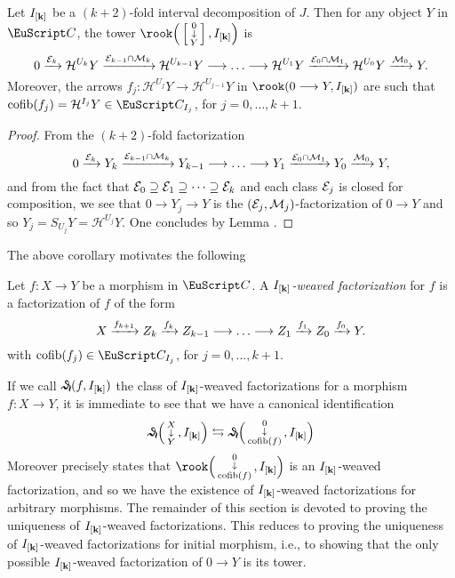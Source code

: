 \begin{corollary}\label{cor:perPostnikov}
Let $I_{[\mathbf{k}]}$ be a $(k+2)$-fold interval decomposition of $J$. Then for any object $Y$ in $\C$, the tower $\rook\Big(\var{0}{Y},I_{\ordk}\Big)$
is
\[
0 \xto{\E_{k}} \mathcal{H}^{U_k}Y \xto{\E_{k-1}\cap \M_{k}} \mathcal{H}^{U_{k-1}}Y\to\dots\to \mathcal{H}^{U_1}Y \xto{\E_{0}\cap \M_{1}} \mathcal{H}^{U_0}Y \xto{\M_{0}} Y.
\]
Moreover, the arrows $f_j\colon \mathcal{H}^{U_j}Y\to \mathcal{H}^{U_{j-1}}Y$ in $\rook(0\to Y,I_{\ordk})$ are such that $\cofib(f_j)=\mathcal{H}^{I_j}Y\in \C_{I_j}$, for $j=0,\dots,k+1$.
\end{corollary}
\begin{proof}
From the $(k+2)$-fold factorization
\[
0 \xto{\E_{k}} Y_{k} \xto{\E_{k-1}\cap \M_{k}} Y_{k-1}\to\dots\to Y_{1} \xto{\E_{0}\cap \M_{1}} Y_{0} \xto{\M_{0}} Y,
\]
and from the fact that $\mathcal{E}_{0}\supseteq \mathcal{E}_{1} \supseteq\dots\supseteq \mathcal{E}_{k}$ and each class $\mathcal{E}_{j}$ is closed for composition, we see that 
$0\to Y_{j}\to Y$ is the $(\mathcal{E}_j,\mathcal{M}_j)$-factorization of $0\to Y$ and so $Y_{j}=S_{U_j}Y=\mathcal{H}^{U_j}Y$. One concludes by Lemma . 
\end{proof}
The above corollary motivates the following
\begin{definition}
Let $f\colon X\to Y$ be a morphism in $\C$. A \emph{$I_{[\mathbf{k}]}$-weaved factorization}  for $f$ is a factorization of $f$ of the form
\[
X \xto{f_{k+1}} Z_{k} \xto{f_{k}} Z_{k-1}\to\dots\to Z_{1} \xto{f_{1}} Z_{0} \xto{f_{0}} Y.
\]
with $\cofib(f_j)\in \C_{I_j}$, for $j=0,\dots,k+1$.
\end{definition}
\begin{remark}
If we call $\weaves(f, I_{\ordk})$ the class of $I_{[\mathbf{k}]}$-weaved factorizations for a morphism $f \colon X\to Y$, it is immediate to see that we have a canonical identification
\[
\weaves\Big(\varnobkt{X}{Y},I_{\ordk}\Big) \leftrightarrows \weaves\Big(\varnobkt{0}{\cofib(f)}, I_{\ordk}\Big)
\]
Moreover \acor{} precisely states that $\rook\Big(\varnobkt{0}{\cofib(f)},I_{\ordk}\Big)$ is an $I_{[\mathbf{k}]}$-weaved factorization, and so we have the existence of $I_{[\mathbf{k}]}$-weaved factorizations for arbitrary morphisms. The remainder of this section is devoted to proving the uniqueness of $I_{[\mathbf{k}]}$-weaved factorizations. This reduces to proving the uniqueness of $I_{[\mathbf{k}]}$-weaved factorizations for initial morphism, i.e., to showing that the only possible $I_{[\mathbf{k}]}$-weaved factorization of $0\to Y$ is its tower.
\end{remark}

